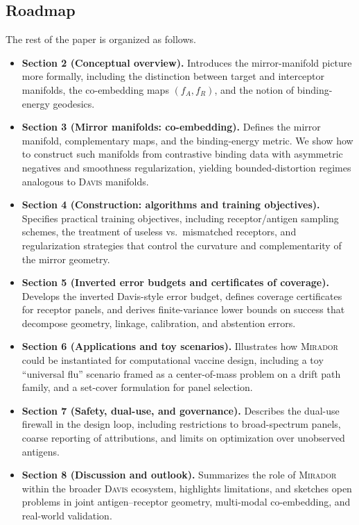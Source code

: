 \documentclass[11pt]{article}
\newcommand{\mirador}{\textsc{Mirador}}
\newcommand{\davis}{\textsc{Davis}}
\begin{document}
\subsection{Roadmap}

The rest of the paper is organized as follows.

\begin{itemize}[leftmargin=*]
  \item \textbf{Section 2 (Conceptual overview).} Introduces the mirror-manifold picture
  more formally, including the distinction between target and interceptor manifolds, the
  co-embedding maps $(f_A, f_R)$, and the notion of binding-energy geodesics.
  \item \textbf{Section 3 (Mirror manifolds: co-embedding).} Defines the mirror manifold,
  complementary maps, and the binding-energy metric. We show how to construct such
  manifolds from contrastive binding data with asymmetric negatives and smoothness
  regularization, yielding bounded-distortion regimes analogous to \davis{} manifolds.
  \item \textbf{Section 4 (Construction: algorithms and training objectives).} Specifies
  practical training objectives, including receptor/antigen sampling schemes, the treatment
  of useless vs.\ mismatched receptors, and regularization strategies that control the
  curvature and complementarity of the mirror geometry.
  \item \textbf{Section 5 (Inverted error budgets and certificates of coverage).} Develops
  the inverted Davis-style error budget, defines coverage certificates for receptor panels,
  and derives finite-variance lower bounds on success that decompose geometry, linkage,
  calibration, and abstention errors.
  \item \textbf{Section 6 (Applications and toy scenarios).} Illustrates how \mirador{}
  could be instantiated for computational vaccine design, including a toy ``universal flu''
  scenario framed as a center-of-mass problem on a drift path family, and a set-cover
  formulation for panel selection.
  \item \textbf{Section 7 (Safety, dual-use, and governance).} Describes the dual-use
  firewall in the design loop, including restrictions to broad-spectrum panels, coarse
  reporting of attributions, and limits on optimization over unobserved antigens.
  \item \textbf{Section 8 (Discussion and outlook).} Summarizes the role of \mirador{}
  within the broader \davis{} ecosystem, highlights limitations, and sketches open problems
  in joint antigen--receptor geometry, multi-modal co-embedding, and real-world validation.
\end{itemize}
\end{document}
